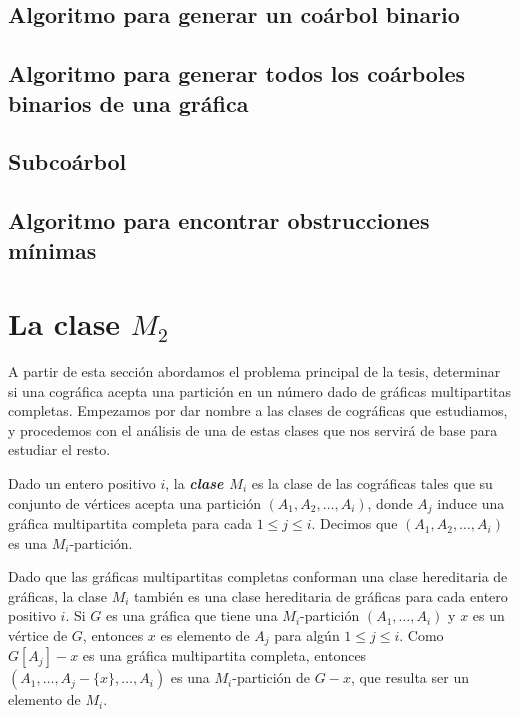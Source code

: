     \subsection{Algoritmo para generar un coárbol binario}
        
    \subsection{Algoritmo para generar todos los coárboles binarios de una gráfica}
        
    \subsection{Subcoárbol}
        
    \subsection{Algoritmo para encontrar obstrucciones mínimas} \label{sec_AlgoSub}
        


\section{La clase $M_2$}

A partir de esta sección abordamos el problema principal de la tesis,
determinar si una cográfica acepta una partición en un número dado de
gráficas multipartitas completas. Empezamos por dar nombre a las clases
de cográficas que estudiamos, y procedemos con el análisis de una de estas
clases que nos servirá de base para estudiar el resto.

Dado un entero positivo $i$, la \textbf{\emph{clase $M_i$}} es la clase de
las cogr\'aficas tales que su conjunto de v\'ertices acepta una partición
$(A_1, A_2, \dots, A_i)$, donde $A_j$ induce una gráfica multipartita
completa para cada $1 \le j \le i$.  Decimos que $(A_1, A_2, \dots, A_i)$
es una $M_i$-partición.

Dado que las gráficas multipartitas completas conforman una clase
hereditaria de gráficas, la clase $M_i$ tambi\'en es una clase hereditaria
de gráficas para cada entero positivo $i$.   Si $G$ es una gr\'afica que
tiene una $M_i$-partición $(A_1, \dots, A_i)$ y $x$ es un v\'ertice de $G$,
entonces $x$ es elemento de $A_j$ para alg\'un $1 \le j \le i$. Como
$G[A_j]-x$ es una gráfica multipartita completa, entonces $(A_1, \dots,
A_j - \{x\}, \dots, A_i)$ es una $M_i$-partici\'on de $G-x$, que resulta
ser un elemento de $M_i$.

